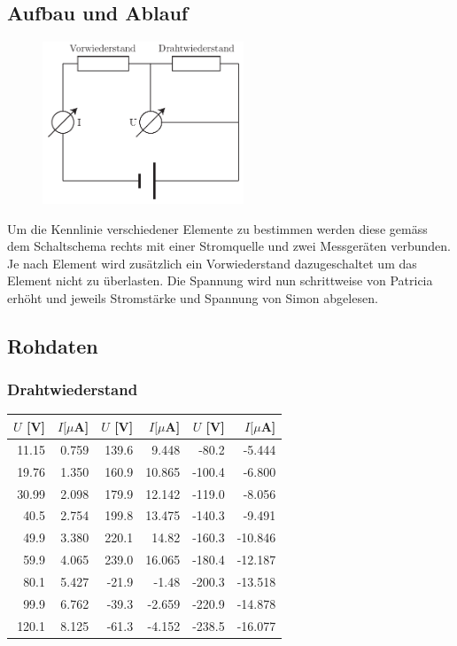 \documentclass[12pt,a4paper]{article}
\begin{document}
\subsection*{Aufbau und Ablauf}
\begin{figure}
\vspace{-15pt}
\centering
\includegraphics[width=6cm]{illustration.pdf}
\end{figure}
Um die Kennlinie verschiedener Elemente zu bestimmen werden diese gem\"ass dem Schaltschema rechts mit einer Stromquelle und zwei Messger\"aten verbunden. Je nach Element wird zus\"atzlich ein Vorwiederstand dazugeschaltet um das Element nicht zu \"uberlasten. Die Spannung wird nun schrittweise von Patricia erh\"oht und jeweils Stromst\"arke und Spannung von Simon abgelesen. 


\subsection*{Rohdaten}

\subsubsection*{Drahtwiederstand}
\begin{tabular}{|r|r|r|r|r|r|}
\hline
$U$ [V]&$I [\mu $A]&$U$ [V]&$I [\mu $A]&$U$ [V]&$I [\mu $A]\\
\hline
11.15&0.759&139.6&9.448&-80.2&-5.444\\
19.76&1.350&160.9&10.865&-100.4&-6.800\\
30.99&2.098&179.9&12.142&-119.0&-8.056\\
40.5&2.754&199.8&13.475&-140.3&-9.491\\
49.9&3.380&220.1&14.82&-160.3&-10.846\\
59.9&4.065&239.0&16.065&-180.4&-12.187\\
80.1&5.427&-21.9&-1.48&-200.3&-13.518\\
99.9&6.762&-39.3&-2.659&-220.9&-14.878\\
120.1&8.125&-61.3&-4.152&-238.5&-16.077\\
\hline
\end{tabular}
\end{document}
